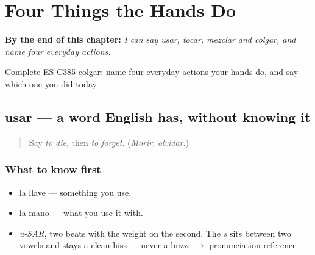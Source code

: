 
\chapter{Four Things the Hands Do}
\label{ch:usar-y-tocar}

\begin{chapteropening}
\textbf{By the end of this chapter:} \emph{I can say usar, tocar, mezclar and colgar, and name four everyday actions.}

Complete ES-C385-colgar: name four everyday actions your hands do, and say which one you did today.
\end{chapteropening}

\section[usar]{usar — a word English has, without knowing it}

\label{lesson:ES-C385-usar}



\begin{quote}
Say \emph{to die}, then \emph{to forget}. (\emph{Morir}; \emph{olvidar}.)
\end{quote}

\subsection*{What to know first}
\begin{itemize}
\raggedright
  \item la llave — something you use.
  \item la mano — what you use it with.
\end{itemize}

\begin{sounds}
\begin{itemize}
\raggedright
  \item \emph{u-SAR}, two beats with the weight on the second. The \emph{s} sits between two vowels and stays a clean hiss — never a buzz. $\to$ pronunciation reference
\end{itemize}
\end{sounds}

